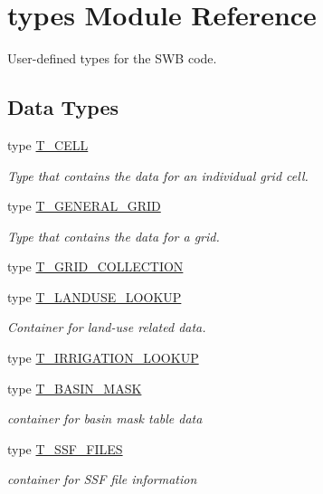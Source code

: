 \hypertarget{namespacetypes}{
\section{types Module Reference}
\label{namespacetypes}
}


User-\/defined types for the SWB code.  


\subsection*{Data Types}
\begin{DoxyCompactItemize}
\item 
type \hyperlink{typetypes_1_1_t___c_e_l_l}{T\_\-CELL}
\begin{DoxyCompactList}\small\item\em Type that contains the data for an individual grid cell. \item\end{DoxyCompactList}\item 
type \hyperlink{typetypes_1_1_t___g_e_n_e_r_a_l___g_r_i_d}{T\_\-GENERAL\_\-GRID}
\begin{DoxyCompactList}\small\item\em Type that contains the data for a grid. \item\end{DoxyCompactList}\item 
type \hyperlink{typetypes_1_1_t___g_r_i_d___c_o_l_l_e_c_t_i_o_n}{T\_\-GRID\_\-COLLECTION}
\item 
type \hyperlink{typetypes_1_1_t___l_a_n_d_u_s_e___l_o_o_k_u_p}{T\_\-LANDUSE\_\-LOOKUP}
\begin{DoxyCompactList}\small\item\em Container for land-\/use related data. \item\end{DoxyCompactList}\item 
type \hyperlink{typetypes_1_1_t___i_r_r_i_g_a_t_i_o_n___l_o_o_k_u_p}{T\_\-IRRIGATION\_\-LOOKUP}
\item 
type \hyperlink{typetypes_1_1_t___b_a_s_i_n___m_a_s_k}{T\_\-BASIN\_\-MASK}
\begin{DoxyCompactList}\small\item\em container for basin mask table data \item\end{DoxyCompactList}\item 
type \hyperlink{typetypes_1_1_t___s_s_f___f_i_l_e_s}{T\_\-SSF\_\-FILES}
\begin{DoxyCompactList}\small\item\em container for SSF file information \item\end{DoxyCompactList}\item 

\end{DoxyCompactItemize}
